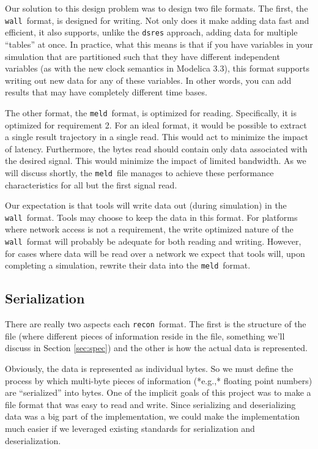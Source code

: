 \documentclass[11pt,a4paper,onecolumn]{article}
\newcommand{\recon}{\texttt{recon}}
\newcommand{\wall}{\texttt{wall}}
\newcommand{\meld}{\texttt{meld}}
\newcommand{\code}[1]{\texttt{#1}} %
\begin{document}

Our solution to this design problem was to design two file formats.
The first, the \wall\ format, is designed for writing.  Not only does
it make adding data fast and efficient, it also supports, unlike the
\code{dsres} approach, adding data for multiple ``tables'' at once.
In practice, what this means is that if you have variables in your
simulation that are partitioned such that they have different
independent variables (as with the new clock semantics in Modelica
3.3), this format supports writing out new data for any of these
variables.  In other words, you can add results that may have
completely different time bases.

The other format, the \meld\ format, is optimized for reading.
Specifically, it is optimized for requirement 2.  For an ideal
format, it would be possible to extract a single result trajectory in
a single read.  This would act to minimize the impact of latency.
Furthermore, the bytes read should contain only data associated with
the desired signal.  This would minimize the impact of limited
bandwidth.  As we will discuss shortly, the \meld\ file manages to
achieve these performance characteristics for all but the first signal
read.

Our expectation is that tools will write data out (during simulation)
in the \wall\ format.  Tools may choose to keep the data in this
format.  For platforms where network access is not a requirement, the
write optimized nature of the \wall\ format will probably be adequate
for both reading and writing.  However, for cases where data will be
read over a network we expect that tools will, upon completing a
simulation, rewrite their data into the \meld\ format.

\subsection{Serialization}


There are really two aspects each \recon\ format.  The first is the
structure of the file (where different pieces of information reside in
the file, something we'll discuss in Section \ref{sec:spec}) and the
other is how the actual data is represented.

Obviously, the data is represented as individual bytes.  So we must
define the process by which multi-byte pieces of information (*e.g.,*
floating point numbers) are ``serialized'' into bytes.  One of the
implicit goals of this project was to make a file format that was easy
to read and write.  Since serializing and deserializing data was a big
part of the implementation, we could make the implementation much
easier if we leveraged existing standards for serialization and
deserialization.
\end{document}
